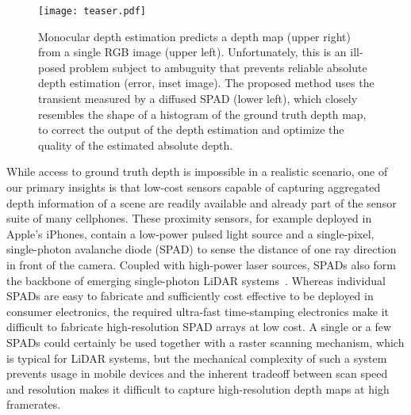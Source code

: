 
\begin{figure}
  \texttt{[image: teaser.pdf]}
  \caption{Monocular depth estimation predicts a depth map (upper right) from a single RGB image (upper left). Unfortunately, this is an ill-posed problem subject to ambuguity that prevents reliable absolute depth estimation (error, inset image). The proposed method uses the transient measured by a diffused SPAD (lower left), which closely resembles the shape of a histogram of the ground truth depth map, to correct the output of the depth estimation and optimize the quality of the estimated absolute depth.}
  \label{fig:teaser}
\end{figure}

While access to ground truth depth is impossible in a realistic scenario, one of our primary insights is that low-cost sensors capable of capturing aggregated depth information of a scene are readily available and already part of the sensor suite of many cellphones. These proximity sensors, for example deployed in Apple's iPhones, contain a low-power pulsed light source and a single-pixel, single-photon avalanche diode (SPAD) to sense the distance of one ray direction in front of the camera. Coupled with high-power laser sources, SPADs also form the backbone of emerging single-photon LiDAR systems~\cite{Kirmani:2014,pawlikowska2017single,Li:2019}. Whereas individual SPADs are easy to fabricate and sufficiently cost effective to be deployed in consumer electronics, the required ultra-fast time-stamping electronics make it difficult to fabricate high-resolution SPAD arrays at low cost. A single or a few SPADs could certainly be used together with a raster scanning mechanism, which is typical for LiDAR systems, but the mechanical complexity of such a system prevents usage in mobile devices and the inherent tradeoff between scan speed and resolution makes it difficult to capture high-resolution depth maps at high framerates.

